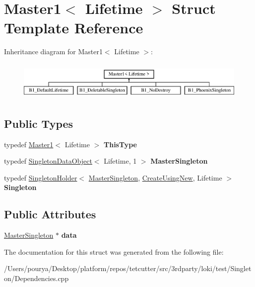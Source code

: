 \hypertarget{structMaster1}{}\section{Master1$<$ Lifetime $>$ Struct Template Reference}
\label{structMaster1}
Inheritance diagram for Master1$<$ Lifetime $>$\+:\begin{figure}[H]
\begin{center}
\leavevmode
\includegraphics[height=1.904762cm]{structMaster1}
\end{center}
\end{figure}
\subsection*{Public Types}
\begin{DoxyCompactItemize}
\item 
\hypertarget{structMaster1_a658cd1ad09bb024ce01b830b3056f520}{}typedef \hyperlink{structMaster1}{Master1}$<$ Lifetime $>$ {\bfseries This\+Type}\label{structMaster1_a658cd1ad09bb024ce01b830b3056f520}

\item 
\hypertarget{structMaster1_adb765f50787c122f1ad9c50e572aed52}{}typedef \hyperlink{structSingletonDataObject}{Singleton\+Data\+Object}$<$ Lifetime, 1 $>$ {\bfseries Master\+Singleton}\label{structMaster1_adb765f50787c122f1ad9c50e572aed52}

\item 
\hypertarget{structMaster1_a1a0e2e16ce48d89616e4cbd6643fa335}{}typedef \hyperlink{classLoki_1_1SingletonHolder}{Singleton\+Holder}$<$ \hyperlink{structSingletonDataObject}{Master\+Singleton}, \hyperlink{structLoki_1_1CreateUsingNew}{Create\+Using\+New}, Lifetime $>$ {\bfseries Singleton}\label{structMaster1_a1a0e2e16ce48d89616e4cbd6643fa335}

\end{DoxyCompactItemize}
\subsection*{Public Attributes}
\begin{DoxyCompactItemize}
\item 
\hypertarget{structMaster1_a810924d9571b4529c6411fe4a9b6ffa7}{}\hyperlink{structSingletonDataObject}{Master\+Singleton} $\ast$ {\bfseries data}\label{structMaster1_a810924d9571b4529c6411fe4a9b6ffa7}

\end{DoxyCompactItemize}


The documentation for this struct was generated from the following file\+:\begin{DoxyCompactItemize}
\item 
/\+Users/pourya/\+Desktop/platform/repos/tetcutter/src/3rdparty/loki/test/\+Singleton/Dependencies.\+cpp\end{DoxyCompactItemize}
